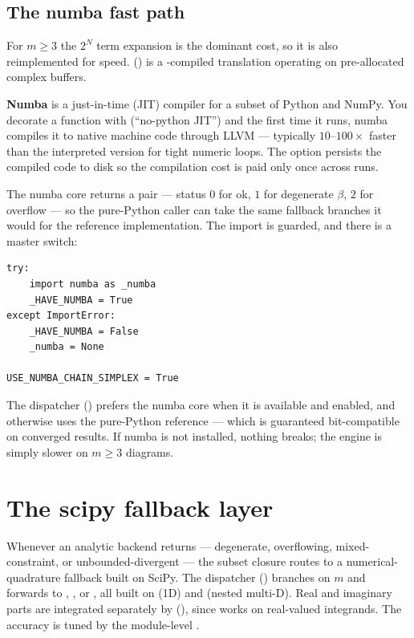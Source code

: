 \subsection{The numba fast path}

For $m\ge 3$ the $2^N$ term expansion is the dominant cost, so it is also
reimplemented for speed. 
() is a -compiled translation operating
on pre-allocated complex buffers.

\begin{defn}
\textbf{Numba} is a just-in-time (JIT) compiler for a subset of Python and NumPy.
You decorate a function with  (``no-python JIT'') and the first
time it runs, numba compiles it to native machine code through LLVM --- typically
$10$--$100\times$ faster than the interpreted version for tight numeric loops. The
 option persists the compiled code to disk so the compilation
cost is paid only once across runs.
\end{defn}

The numba core returns a  pair --- status $0$ for ok, $1$
for degenerate $\beta$, $2$ for overflow --- so the pure-Python caller can take the
same fallback branches it would for the reference implementation. The import is
guarded, and there is a master switch:

\begin{lstlisting}
try:
    import numba as _numba
    _HAVE_NUMBA = True
except ImportError:
    _HAVE_NUMBA = False
    _numba = None

USE_NUMBA_CHAIN_SIMPLEX = True
\end{lstlisting}

\noindent The dispatcher 
() prefers the numba core when it is available and
enabled, and otherwise uses the pure-Python reference --- which is guaranteed
bit-compatible on converged results. If numba is not installed, nothing breaks;
the engine is simply slower on $m\ge 3$ diagrams.

\section{The scipy fallback layer}\label{sec:scipy}

Whenever an analytic backend returns  --- degenerate, overflowing,
mixed-constraint, or unbounded-divergent --- the subset closure routes to a
numerical-quadrature fallback built on SciPy. The dispatcher
 () branches on $m$ and
forwards to , , or
, all built on  (1D)
and  (nested multi-D). Real and imaginary parts are integrated
separately by  (), since
 works on real-valued integrands. The accuracy is tuned by the
module-level .

